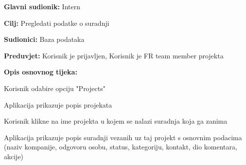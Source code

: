 					\noindent {}
					\begin{packed_item}
					
						\item \textbf{Glavni sudionik:} Intern
						\item \textbf{Cilj:} Pregledati podatke o suradnji
						\item \textbf{Sudionici:} Baza podataka
						\item \textbf{Preduvjet:} Korisnik je prijavljen, Korisnik je FR team member projekta
						\item \textbf{Opis osnovnog tijeka:}

						\item[] \begin{packed_enum}

							\item Korisnik odabire opciju "Projects"
							\item Aplikacija prikazuje popis projekata
							\item Korisnik klikne na ime projekta u kojem se nalazi suradnja koja ga zanima
							\item Aplikacija prikazuje popis suradnji vezanih uz taj projekt s osnovnim podacima (naziv kompanije, odgovoru osobu, status, kategoriju, kontakt, dio komentara, akcije)
						\end{packed_enum}
	
					\end{packed_item}

